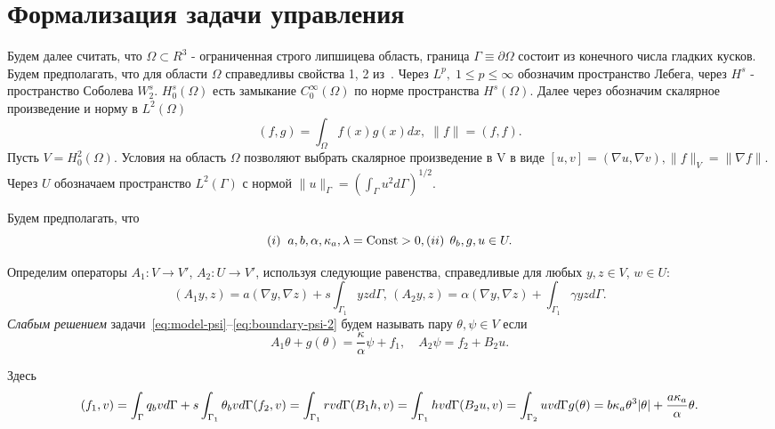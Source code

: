 \section{Формализация задачи управления}\label{sec:formalization}
Будем далее считать, что $\Omega \subset R^3$ - ограниченная строго липшицева область,
граница $\Gamma \equiv \partial \Omega$ состоит из конечного числа гладких кусков.
Будем предполагать, что для области $\Omega$ справедливы свойства 1, 2 из~\cite{}.
Через $L^p, \; 1 \leq p \leq \infty$ обозначим пространство Лебега, через $H^s$ - пространство Соболева $W^s_2$.
$H^s_0(\Omega)$ есть замыкание $C^\infty_0(\Omega)$ по норме пространства $H^s(\Omega)$.
Далее через обозначим скалярное произведение и норму в $L^2(\Omega)$
\[
    (f, g) = \int_\Omega f(x)g(x)dx, \; \| f \| = (f, f).
\]
Пусть $V = H^2_0(\Omega)$.
Условия на область $\Omega$ позволяют выбрать скалярное произведение в V в виде
$[u, v] = (\nabla u, \nabla v), \| f \|_V = \| \nabla f \|$.
Через $U$ обозначаем пространство $L^2(\Gamma)$ с нормой
$\|u\|_\Gamma=\left(\int_\Gamma u^2 d\Gamma\right)^{1/2}.$

Будем предполагать, что
\[
    (i) \;\; a,b,\alpha,\kappa_a, \lambda =\textrm{Const} > 0 , \\
    (ii) \;\, \theta_b, g, u \in U.
\]

Определим операторы $A_1\colon V \to V'$, $A_2\colon U \to V'$, используя
следующие равенства, справедливые для любых $y,z \in V$, $w\in U$:
\[
    (A_1 y,z) = a(\nabla y, \nabla z) + s\int_{\Gamma_1} yz d\Gamma, \,
    (A_2 y, z) = \alpha (\nabla y, \nabla z) + \int_{\Gamma_1} \gamma yz d\Gamma.
\]
\textit{Слабым решением} задачи~\eqref{eq:model-psi}--\eqref{eq:boundary-psi-2} будем называть
пару $\theta, \psi \in V$ если
\begin{equation}
    \label{eq:weak}
    A_1\theta  + g(\theta) = \frac{\kappa}{\alpha} \psi + f_1, \quad
    A_2\psi = f_2 + B_2 u.
\end{equation}

Здесь
\[
    (f_1, v) = \int_{\Gamma} q_b v d\Gamma + s \int_{\Gamma_1} \theta_b v d\Gamma \\
    (f_2, v) = \int_{\Gamma_1} r v d\Gamma \\
    (B_1 h,v) = \int_{\Gamma_1} h v d\Gamma \\
    (B_2 u, v) = \int_{\Gamma_2} u v d\Gamma \\
    g(\theta) = b\kappa_a \theta^3 |\theta| + \frac{a\kappa_a}{\alpha}\theta.
\]

